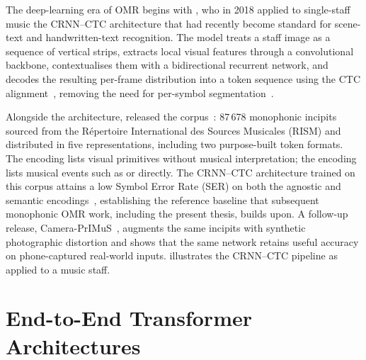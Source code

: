 The deep-learning era of OMR begins with
\textcite{calvoZaragozaEndToEndNeural2018}, who in 2018 applied to
single-staff music the CRNN--CTC architecture that had recently become
standard for scene-text and handwritten-text recognition.
The model treats a staff image as a sequence of vertical strips, extracts
local visual features through a convolutional backbone, contextualises them
with a bidirectional recurrent network, and decodes the resulting per-frame
distribution into a token sequence using the CTC
alignment~\cite{gravesConnectionistTemporal2006}, removing the need for
per-symbol segmentation~\cite{shiEndToEndTrainable2017}.

Alongside the architecture, \textcite{calvoZaragozaEndToEndNeural2018}
released the  corpus~\cite{PrIMuSDataset}: 87\,678 monophonic
incipits sourced from the R\'epertoire International des Sources
Musicales (RISM) and distributed in five
representations, including two purpose-built token formats.
The  encoding lists visual primitives without musical
interpretation; the  encoding lists musical events such as
 or  directly.
The CRNN--CTC architecture trained on this corpus attains a low Symbol Error
Rate (SER) on both the agnostic and semantic
encodings~\cite{calvoZaragozaEndToEndNeural2018}, establishing the reference
baseline that subsequent monophonic OMR work, including the present thesis,
builds upon.
A follow-up release, Camera-PrIMuS~\cite{calvoZaragozaCameraPrimus2018},
augments the same incipits with synthetic photographic distortion and
shows that the same network retains useful accuracy on
phone-captured real-world inputs.
 illustrates the CRNN--CTC pipeline as applied
to a music staff.



\section{End-to-End Transformer Architectures}
\label{sec:soa-transformer}


